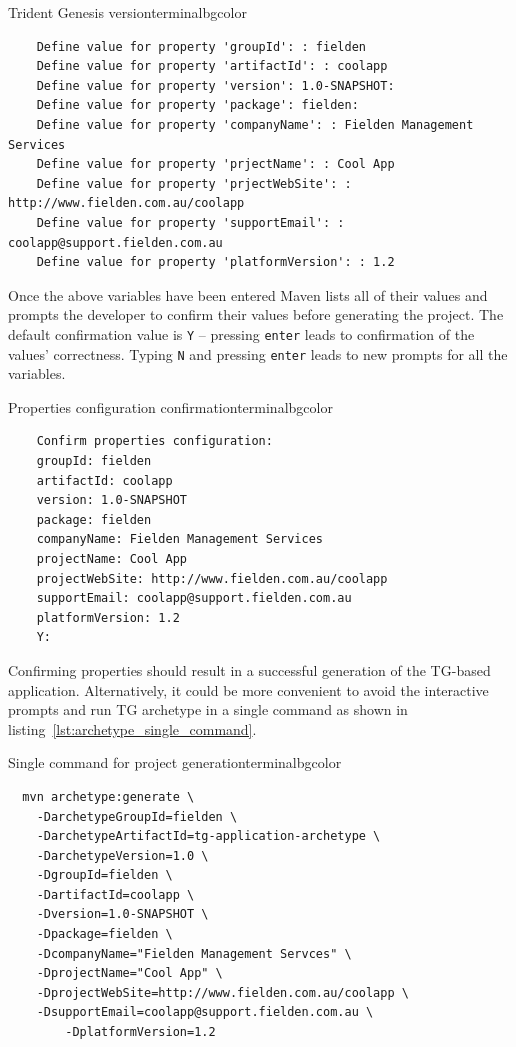 \begin{enumerate}
    \begin{code}{Trident Genesis version}{\label{lst::archetype-platformVerson}}{terminalbgcolor}
      \begin{lstlisting}
	Define value for property 'groupId': : fielden		
	Define value for property 'artifactId': : coolapp
	Define value for property 'version': 1.0-SNAPSHOT:
	Define value for property 'package': fielden:	
	Define value for property 'companyName': : Fielden Management Services
	Define value for property 'prjectName': : Cool App
	Define value for property 'prjectWebSite': : http://www.fielden.com.au/coolapp
	Define value for property 'supportEmail': : coolapp@support.fielden.com.au
	Define value for property 'platformVersion': : 1.2
      \end{lstlisting}
    \end{code}

  \end{enumerate}

  Once the above variables have been entered Maven lists all of their values and prompts the developer to confirm their values before generating the project. 
  The default confirmation value is \texttt{Y} -- pressing \texttt{enter} leads to confirmation of the values' correctness. 
  Typing \texttt{N} and pressing \texttt{enter} leads to new prompts for all the variables.

  
  \begin{code}{Properties configuration confirmation}{\label{lst:properties_confirmation}}{terminalbgcolor}
      \begin{lstlisting}
	Confirm properties configuration:
	groupId: fielden
	artifactId: coolapp
	version: 1.0-SNAPSHOT
	package: fielden
	companyName: Fielden Management Services
	projectName: Cool App
	projectWebSite: http://www.fielden.com.au/coolapp
	supportEmail: coolapp@support.fielden.com.au
	platformVersion: 1.2
	Y:
      \end{lstlisting}
  \end{code}

  Confirming properties should result in a successful generation of the TG-based application.
  Alternatively, it could be more convenient to avoid the interactive prompts and run TG archetype in a single command as shown in listing~\ref{lst:archetype_single_command}.

  \begin{code}{Single command for project generation}{\label{lst:archetype_single_command}}{terminalbgcolor}
      \begin{lstlisting}
  mvn archetype:generate \
	-DarchetypeGroupId=fielden \
	-DarchetypeArtifactId=tg-application-archetype \
	-DarchetypeVersion=1.0 \
	-DgroupId=fielden \
	-DartifactId=coolapp \
	-Dversion=1.0-SNAPSHOT \
	-Dpackage=fielden \
	-DcompanyName="Fielden Management Servces" \
	-DprojectName="Cool App" \
	-DprojectWebSite=http://www.fielden.com.au/coolapp \
	-DsupportEmail=coolapp@support.fielden.com.au \
        -DplatformVersion=1.2
      \end{lstlisting}
  \end{code}

